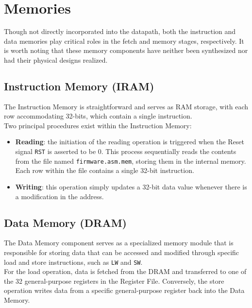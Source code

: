 \chapter{Memories}
\label{chap:04_memories}
Though not directly incorporated into the datapath, both the instruction and data memories play critical roles in the fetch and memory stages, respectively. It is worth noting that these memory components have neither been synthesized nor had their physical designs realized.

\section{Instruction Memory (IRAM)}
The Instruction Memory is straightforward and serves as RAM storage, with each row accommodating 32-bits, which contain a single instruction. \\

Two principal procedures exist within the Instruction Memory:

\begin{itemize}
	\item \textbf{Reading}: the initiation of the reading operation is triggered when the Reset signal \texttt{RST} is asserted to be 0. This process sequentially reads the contents from the file named \texttt{firmware.asm.mem}, storing them in the internal memory. Each row within the file contains a single 32-bit instruction.
    
	\item \textbf{Writing}: this operation simply updates a 32-bit data value whenever there is a modification in the address.
\end{itemize}

\section{Data Memory (DRAM)}

The Data Memory component serves as a specialized memory module that is responsible for storing data that can be accessed and modified through specific load and store instructions, such as \texttt{LW} and \texttt{SW}. \\

For the load operation, data is fetched from the DRAM and transferred to one of the 32 general-purpose registers in the Register File. Conversely, the store operation writes data from a specific general-purpose register back into the Data Memory. \\

